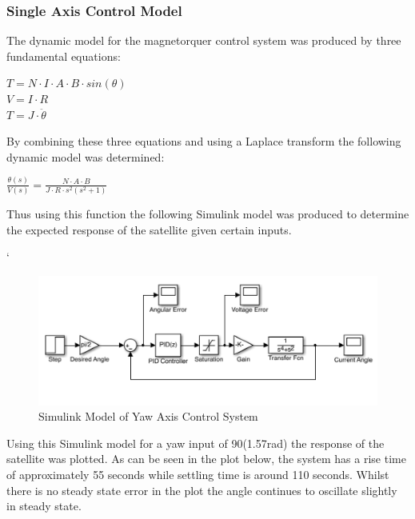 \subsubsection{Single Axis Control Model}
The dynamic model for the magnetorquer control system was produced by three fundamental equations:
\begin{center}
    $T = N \cdot I \cdot A \cdot B \cdot sin(\theta)$ \vspace{2mm} \\
    $V = I \cdot R$\vspace{2mm}\\
    $T = J \cdot \ddot{\theta}$\\
\end{center}
By combining these three equations and using a Laplace transform the following dynamic model was determined:
\begin{center}
    $\frac{\theta(s)}{V(s)} = \frac{N \cdot A \cdot B}{J \cdot R \cdot s^2 (s^2 + 1)}$
\end{center}
Thus using this function the following Simulink model was produced to determine the expected response of the satellite given certain inputs.
\vspace{-6mm}
\begin{center}`
    \begin{figure}[H]
        \caption{Simulink Model of Yaw Axis Control System}
        \vspace{-4mm}
        \centering
        \includegraphics[scale = 0.8]{./figures/Simulink_ADCS_Model}
    \end{figure}
\end{center}
\vspace{-5mm}
Using this Simulink model for a yaw input of 90\textdegree (1.57rad) the response of the satellite was plotted.  As can be seen in the plot below, the system has a rise time of approximately 55 seconds while settling time is around 110 seconds.  Whilst there is no steady state error in the plot the angle continues to oscillate slightly in steady state.
